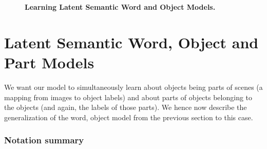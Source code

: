 \begin{figure}[t!]
  \begin{center}
    \caption{{\bf Learning Latent Semantic Word and Object Models.}}
    \label{fig:wsabie}
    \end{center}
\end{figure}



\section{Latent Semantic Word, Object and Part Models}\label{sec:jmodels}
 

We want our model to simultaneously learn about objects being parts of scenes 
(a mapping from images to object labels) and about parts of objects
belonging to the objects (and again, the labels of those parts).
We hence now describe the generalization of the word, object model 
from the previous section to this case. 

\subsubsection*{Notation summary}

